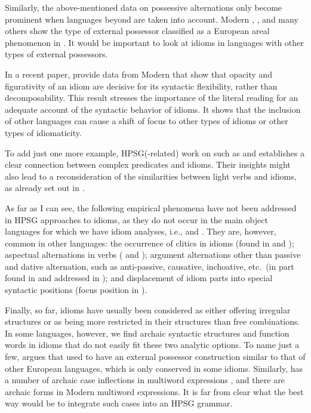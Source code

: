 \documentclass[output=paper
 	        ,biblatex
                ,babelshorthands
                ,newtxmath
                ,draftmode
                ,colorlinks, citecolor=brown
]{langscibook}
\begin{document}
Similarly, the above-mentioned data on possessive alternations only become prominent when languages beyond  are taken into account. Modern , , and many others
show the type of external possessor classified as a European areal phenomenon in \citet{Haspelmath:99}. 
It would be important to look at idioms in languages with other types of external possessors.


In a recent paper, \citet{Sheinfux:al:19} provide data from Modern  that show that opacity and figurativity of an idiom are decisive for its syntactic flexibility, rather than decomposability.
This result stresses the importance of the literal reading for an adequate account of the syntactic behavior of idioms. 
%
It shows that the inclusion of other languages can cause a shift of focus to other types of idioms or other types of idiomaticity. 

To add just one more example, HPSG(-related) work on  such as \citet{MuellerPersian}
and \citet{Samvelian:Faghiri:16} establishes a clear connection between complex predicates and
idioms. Their insights might also lead to a reconsideration of the similarities between light verbs
and idioms, as already set out in \citet{KE94a}. 


As far as I can see, the following empirical phenomena have not been addressed in HPSG approaches to
idioms, as they do not occur in the main object languages for which we have idiom analyses, i.e.,
 and . They are, however, common in other languages: the occurrence of
clitics in idioms (found in  and );
aspectual alternations in verbs ( and ); argument
alternations other than passive and dative alternation, such as anti-passive,
causative, inchoative, etc.\ (in part found in  and
addressed in \citealt{Sheinfux:al:19}); and displacement of idiom parts into special syntactic
positions (focus position in ).

Finally, so far, idioms have usually been considered as either offering irregular structures or as
being more restricted in their structures than free combinations. In some languages, however, we
find archaic syntactic structures and function words in idioms that do not easily fit these two
analytic options. To name just a few, \citet{Lodrup:09} argues that 
used to have an external possessor construction similar to that of other European languages, which
is only conserved in some idioms. Similarly,  has a number of archaic case
inflections in multiword expressions \citep[]{Kuiper:18}, and there are archaic forms in
Modern  multiword expressions. It is far from clear what the best way would be
to integrate such cases into an HPSG grammar.
\end{document}
